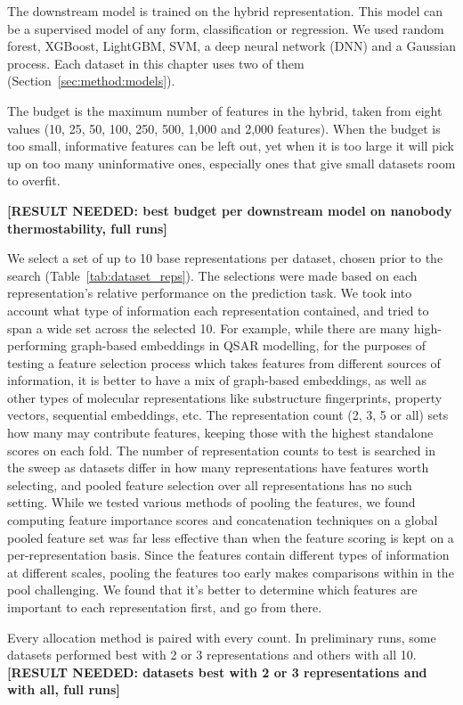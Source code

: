 The downstream model is trained on the hybrid representation. This model can be a supervised model of any form, classification or regression. We used random forest, XGBoost, LightGBM, SVM, a deep neural network (DNN) and a Gaussian process. Each dataset in this chapter uses two of them (Section~\ref{sec:method:models}). 

The budget is the maximum number of features in the hybrid, taken from eight values (10, 25, 50, 100, 250, 500, 1,000 and 2,000 features). When the budget is too small, informative features can be left out, yet when it is too large it will pick up on too many uninformative ones, especially ones that give small datasets room to overfit. 

\textbf{[RESULT NEEDED: best budget per downstream model on nanobody thermostability, full runs]}

We select a set of up to 10 base representations per dataset, chosen prior to the search (Table~\ref{tab:dataset_reps}). The selections were made based on each representation's relative performance on the prediction task. We took into account what type of information each representation contained, and tried to span a wide set across the selected 10. For example, while there are many high-performing graph-based embeddings in QSAR modelling, for the purposes of testing a feature selection process which takes features from different sources of information, it is better to have a mix of graph-based embeddings, as well as other types of molecular representations like substructure fingerprints, property vectors, sequential embeddings, etc.  The representation count (2, 3, 5 or all) sets how many may contribute features, keeping those with the highest standalone scores on each fold. The number of representation counts to test is searched in the sweep as datasets differ in how many representations have features worth selecting, and pooled feature selection over all representations has no such setting. While we tested various methods of pooling the features, we found computing feature importance scores and concatenation techniques on a global pooled feature set was far less effective than when the feature scoring is kept on a per-representation basis. Since the features contain different types of information at different scales, pooling the features too early makes comparisons within in the pool challenging. We found that it's better to determine which features are important to each representation first, and go from there.

Every allocation method is paired with every count. In preliminary runs, some datasets performed best with 2 or 3 representations and others with all 10. \textbf{[RESULT NEEDED: datasets best with 2 or 3 representations and with all, full runs]}

